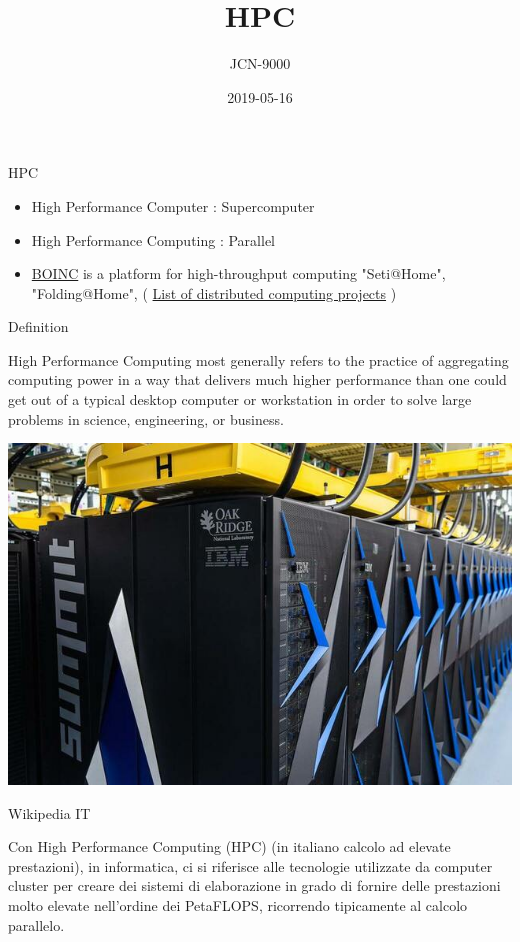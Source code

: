 \documentclass[ignorenonframetext,]{beamer}
\title{HPC}
\author{JCN-9000}
\date{2019-05-16}
\providecommand{\tightlist}{%
  \setlength{\itemsep}{0pt}\setlength{\parskip}{0pt}}
\begin{document}
\frame{\titlepage}

\begin{frame}{HPC}

\begin{itemize}
\item
  High Performance Computer : Supercomputer
\item
  High Performance Computing : Parallel
\item
  \href{https://boinc.berkeley.edu/}{BOINC} is a platform for
  high-throughput computing "Seti@Home", "Folding@Home", (
  \href{https://en.wikipedia.org/wiki/List_of_distributed_computing_projects}{List
  of distributed computing projects} )
\end{itemize}

\end{frame}

\begin{frame}{Definition}


\begin{description}
\tightlist
\item[\href{https://insidehpc.com/hpc-basic-training/what-is-hpc/}{HPC}]
High Performance Computing most generally refers to the practice of
aggregating computing power in a way that delivers much higher
performance than one could get out of a typical desktop computer or
workstation in order to solve large problems in science, engineering, or
business.
\end{description}

\includegraphics{images/Summit_small.jpg}

\end{frame}

\begin{frame}{Wikipedia IT}

\begin{description}
\tightlist
\item[\href{https://it.wikipedia.org/wiki/High_Performance_Computing}{HPC}]
Con High Performance Computing (HPC) (in italiano calcolo ad elevate
prestazioni), in informatica, ci si riferisce alle tecnologie utilizzate
da computer cluster per creare dei sistemi di elaborazione in grado di
fornire delle prestazioni molto elevate nell'ordine dei PetaFLOPS,
ricorrendo tipicamente al calcolo parallelo.
\end{description}

\end{frame}
\end{document}
